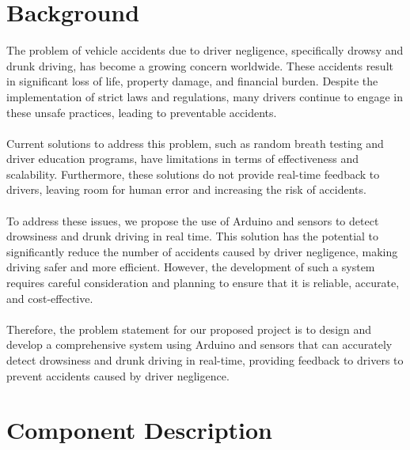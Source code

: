 \documentclass[12pt]{article}
\begin{document}
\section{Background}
The problem of vehicle accidents due to driver negligence, specifically drowsy and drunk driving, has become a growing concern worldwide. These accidents result in significant loss of life, property damage, and financial burden. Despite the implementation of strict laws and regulations, many drivers continue to engage in these unsafe practices, leading to preventable accidents.
\\
\\
Current solutions to address this problem, such as random breath testing and driver education programs, have limitations in terms of effectiveness and scalability. Furthermore, these solutions do not provide real-time feedback to drivers, leaving room for human error and increasing the risk of accidents.
\\
\\
To address these issues, we propose the use of Arduino and sensors to detect drowsiness and drunk driving in real time. This solution has the potential to significantly reduce the number of accidents caused by driver negligence, making driving safer and more efficient. However, the development of such a system requires careful consideration and planning to ensure that it is reliable, accurate, and cost-effective.
\\ 
\\
Therefore, the problem statement for our proposed project is to design and develop a comprehensive system using Arduino and sensors that can accurately detect drowsiness and drunk driving in real-time, providing feedback to drivers to prevent accidents caused by driver negligence.

\section{Component Description}
\end{document}
